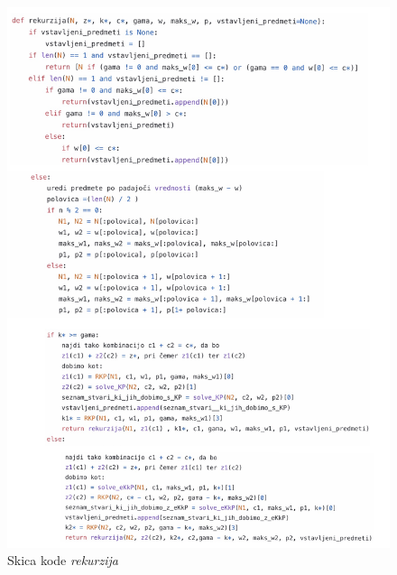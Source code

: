 \documentclass[a4paper,12pt]{article}
\theoremstyle{definition}
\begin{document}
\begin{figure}[h!]
    \includegraphics[width=13cm]{rekurzija.JPG}
    \caption{Skica kode \textit{rekurzija}}
    \label{fig:koda4}    
\end{figure}
\end{document}
